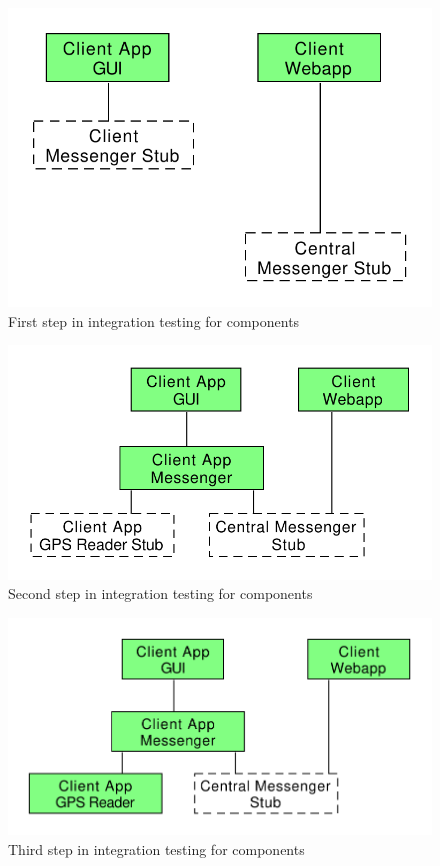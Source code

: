 \begin{figure}
\centering
\includegraphics[width=\textwidth]{tex-images/comp-1}
\caption{First step in integration testing for components}
\end{figure}

\begin{figure}
\centering
\includegraphics[width=\textwidth]{tex-images/comp-2}
\caption{Second step in integration testing for components}
\end{figure}

\begin{figure}
\centering
\includegraphics[width=\textwidth]{tex-images/comp-3}
\caption{Third step in integration testing for components}
\end{figure}

